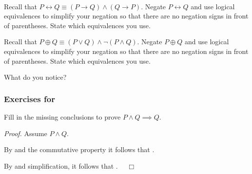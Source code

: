 \begin{exer}[\exerE] %
\label{exer_negating_biconditional_using_equiv}
~
    \begin{apart}
        \item Recall that $P \leftrightarrow Q \equiv (P \to Q) \land (Q \to P)$. Negate $P \leftrightarrow Q$ and use logical equivalences to simplify your negation so that there are no negation signs in front of parentheses. State which equivalences you use.
        \item Recall that $P \oplus Q \equiv (P \lor Q) \land \neg (P \land Q)$.  Negate $P \oplus Q$ and use logical equivalences to simplify your negation so that there are no negation signs in front of parentheses. State which equivalences you use.
        \item What do you notice?
    \end{apart}
\end{exer}


\subsubsection*{Exercises for  \subinference}

\begin{exer}[\exerP] %
\label{exer_proof_PandQimpliesQ}
    Fill in the missing conclusions to prove $P \land Q \implies Q$. 

        \emph{Proof.} Assume  $P \land Q$.  
        
        By  and the commutative property it follows that  \underline{\hspace{.75 in}}.
        
        By  and simplification, it follows that \underline{\hspace{.75 in}}.~ \hfill ~$\Box$ 
\end{exer}

